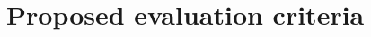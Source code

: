 \documentclass[12pt, a4paper]{article}
\begin{document}
\section{Proposed evaluation criteria}\label{sec:proposed-evaluation-criteria}



\end{document}
